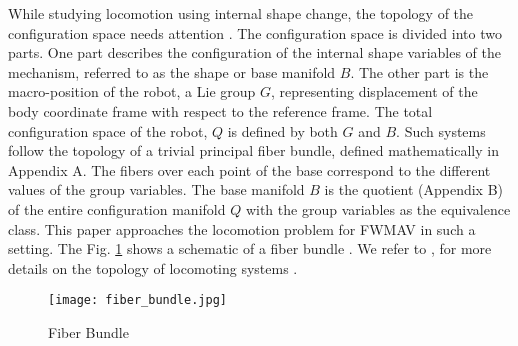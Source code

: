 \documentclass[letterpaper, 10 pt, conference]{ieeeconf}  \newcommand{\RN}[1]{\textup{\uppercase\expandafter{\romannumeral#1}}}
\begin{document}
While studying locomotion using internal shape change, the topology of the configuration space needs attention \cite{kelly murray}. The configuration space is divided into two parts. One part describes the configuration of the internal shape variables of the mechanism, referred to as the shape or base manifold $B$. The other part is the macro-position of the robot, a Lie group $G$, representing displacement of the body coordinate frame with respect to the reference frame. The total configuration space of the robot, $Q$ is defined by both $G$ and $B$. Such systems follow the topology of a trivial principal fiber bundle, defined mathematically in Appendix A. The fibers over each point of the base correspond to the different values of the group variables. The base manifold $B$ is the quotient (Appendix B) of the entire configuration manifold $Q$ with the group variables as the equivalence class. This paper approaches the locomotion problem for FWMAV in such a setting. The Fig. \ref{fiber_bundle} shows a schematic of a fiber bundle \cite{wolfram_website}. We refer to \cite{Gallier}, \cite{Wilson} for more details on the topology of locomoting systems .

\begin{figure}[h!]
\centering
\texttt{[image: fiber\_bundle.jpg]} 
\caption{Fiber Bundle}
\label{fiber_bundle}
\end{figure}
\end{document}
